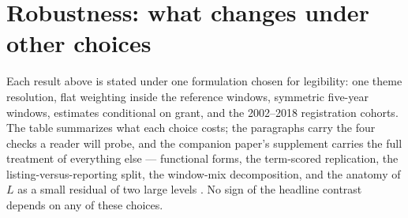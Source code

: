 \section{Robustness: what changes under other choices}\label{sec:robust}

Each result above is stated under one formulation chosen for legibility:
one theme resolution, flat weighting inside the reference windows,
symmetric five-year windows, estimates conditional on grant, and the
2002--2018 registration cohorts. The table summarizes what each choice
costs; the paragraphs carry the four checks a reader will probe, and the
companion paper's supplement carries the full treatment of everything
else --- functional forms, the term-scored replication, the
listing-versus-reporting split, the window-mix decomposition, and the
anatomy of $L$ as a small residual of two large levels
\citep{SilverCorpus2026}. No sign of the headline contrast depends on
any of these choices.

